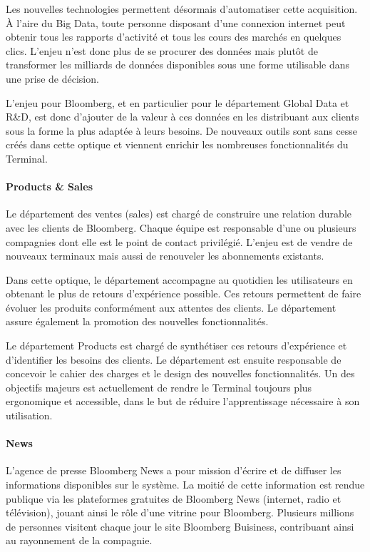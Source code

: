 \documentclass[11pt, oneside, titlepage, a4paper]{article}
\begin{document}
Les nouvelles technologies permettent désormais d'automatiser cette acquisition. À l'aire du Big Data, toute personne disposant d'une connexion internet peut obtenir tous les rapports d'activité et tous les cours des marchés en quelques clics. L'enjeu n'est donc plus de se procurer des données mais plutôt de transformer les milliards de données disponibles sous une forme utilisable dans une prise de décision. 

L'enjeu pour Bloomberg, et en particulier pour le département Global Data et R\&D, est donc d'ajouter de la valeur à ces données en les distribuant aux clients sous la forme la plus adaptée à leurs besoins. De nouveaux outils sont sans cesse créés dans cette optique et viennent enrichir les nombreuses fonctionnalités du Terminal.
\paragraph{Products \& Sales}
Le département des ventes (sales) est chargé de construire une relation durable avec les clients de Bloomberg. Chaque équipe est responsable d'une ou plusieurs compagnies dont elle est le point de contact privilégié. L'enjeu est de vendre de nouveaux terminaux mais aussi de renouveler les abonnements existants.

Dans cette optique, le département accompagne au quotidien les utilisateurs en obtenant le plus de retours d'expérience possible. Ces retours permettent de faire évoluer les produits conformément aux attentes des clients. Le département assure également la promotion des nouvelles fonctionnalités.

Le département Products est chargé de synthétiser ces retours d'expérience et d'identifier les besoins des clients. Le département est ensuite responsable de concevoir le cahier des charges et le design des nouvelles fonctionnalités. Un des objectifs majeurs est actuellement de rendre le Terminal toujours plus ergonomique et accessible, dans le but de réduire l'apprentissage nécessaire à son utilisation.
\paragraph{News}
L'agence de presse Bloomberg News a pour mission d'écrire et de diffuser les informations disponibles sur le système. La moitié de cette information est rendue publique via les plateformes gratuites de Bloomberg News (internet, radio et télévision), jouant ainsi le rôle d'une vitrine pour Bloomberg. Plusieurs millions de personnes visitent chaque jour le site Bloomberg Buisiness, contribuant ainsi au rayonnement de la compagnie.
\end{document}
